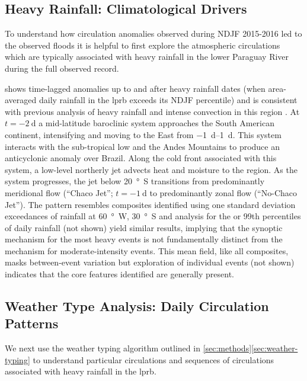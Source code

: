 \documentclass{ametsoc}
\begin{document}
\subsection{Heavy Rainfall: Climatological Drivers}\label{sec:rainfall-circulation}

To understand how circulation anomalies observed during NDJF 2015-2016 led to the observed floods it is helpful to first explore the atmospheric circulations which are typically associated with heavy rainfall in the lower Paraguay River during the full observed record.

 shows time-lagged anomalies up to and after heavy rainfall dates (when area-averaged daily rainfall in the \gls{lprb} exceeds its NDJF  percentile) and is consistent with previous analysis of heavy rainfall and intense convection in this region \citep{Liebmann2004,Marengo2004,Salio2007,Marwan2015}.
At $t=\SI{-2}{\day}$ a mid-latitude baroclinic system approaches the South American continent, intensifying and moving to the East from \SIrange{-1}{1}{\day}.
This system interacts with the sub-tropical low and the Andes Mountains to produce an anticyclonic anomaly over Brazil.
Along the cold front associated with this system, a low-level northerly jet advects  heat and moisture to the region.
As the system progresses, the jet below \SI{20}{\degree S} transitions from predominantly meridional flow (``Chaco Jet''; $t=\SI{-1}{\day}$ to predominantly zonal flow (``No-Chaco Jet'').
The pattern resembles composites identified using one standard deviation exceedances of rainfall at \SI{60}{\degree W}, \SI{30}{\degree S} \citep{Liebmann2004} and analysis for the  or 99th percentiles of daily rainfall (not shown) yield similar results, implying that the synoptic mechanism for the most heavy events is not fundamentally distinct from the mechanism for moderate-intensity events.
This mean field, like all composites, masks between-event variation but exploration of individual events (not shown) indicates that the core features identified are generally present.

\subsection{Weather Type Analysis: Daily Circulation Patterns}\label{sec:weather-types}

We next use the weather typing algorithm outlined in \cref{sec:methods}\ref{sec:weather-typing} to understand particular circulations and sequences of circulations associated with heavy rainfall in the \gls{lprb}.
\end{document}
